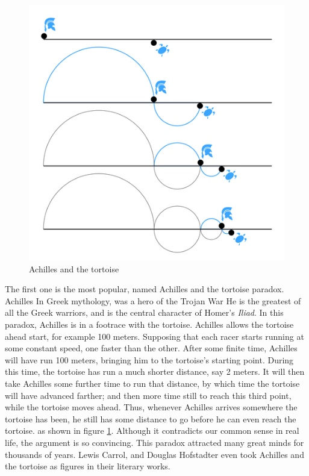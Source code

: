 \documentclass{article}
\begin{document}
\begin{figure}[htbp]
 \centering
 \includegraphics[scale=0.4]{img/Achilles-paradox.png}
 \caption{Achilles and the tortoise}
 \label{fig:Achilles-paradox}
\end{figure}

The first one is the most popular, named Achilles and the tortoise paradox. Achilles In Greek mythology, was a hero of the Trojan War He is the greatest of all the Greek warriors, and is the central character of Homer's {\em Iliad}. In this paradox, Achilles is in a footrace with the tortoise. Achilles allows the tortoise ahead start, for example 100 meters. Supposing that each racer starts running at some constant speed, one faster than the other. After some finite time, Achilles will have run 100 meters, bringing him to the tortoise's starting point. During this time, the tortoise has run a much shorter distance, say 2 meters. It will then take Achilles some further time to run that distance, by which time the tortoise will have advanced farther; and then more time still to reach this third point, while the tortoise moves ahead. Thus, whenever Achilles arrives somewhere the tortoise has been, he still has some distance to go before he can even reach the tortoise. as shown in figure \ref{fig:Achilles-paradox}. Although it contradicts our common sense in real life, the argument is so convincing. This paradox attracted many great minds for thousands of years. Lewis Carrol, and Douglas Hofstadter even took Achilles and the tortoise as figures in their literary works.
\end{document}
